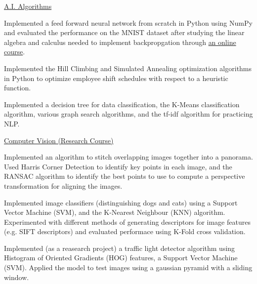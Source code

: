 
\begin{cventries}
  \cventry
    {} %
    {\href{https://github.com/dangbert/AI}{A.I. Algorithms}} %
    {} %
    {} %
    {
      \begin{cvitems} %
      \item {Implemented a feed forward neural network from scratch in Python using NumPy and evaluated the performance on the MNIST dataset after studying the linear algebra and calculus needed to implement backpropgation through \href{http://neuralnetworksanddeeplearning.com/}{an online course}.}
      \item {Implemented the Hill Climbing and Simulated Annealing optimization algorithms in Python 
to optimize employee shift schedules with respect to a heuristic function.}
      \item {Implemented a decision tree for data classification, the K-Means classification algorithm, various graph search algorithms, and the tf-idf algorithm for practicing NLP.}
      \end{cvitems}
    }

  \cventry
    {} %
    {\href{https://github.com/dangbert/college/tree/master/cmsc491-vision}{Computer Vision (Research Course)}} %
    {} %
    {} %
    {
      \begin{cvitems} %
        \item {Implemented an algorithm to stitch overlapping images together into a panorama.  Used Harris Corner Detection to identify key points in each image, and the RANSAC algorithm to identify the best points to use to compute a perspective transformation for aligning the images.}
        \item {Implemented image classifiers (distinguishing dogs and cats) using a Support Vector Machine (SVM), and the K-Nearest Neighbour (KNN) algorithm.  Experimented with different methods of generating descriptors for image features (e.g. SIFT descriptors) and evaluated performace using K-Fold cross validation.}
        \item {Implemented (as a reasearch project) a traffic light detector algorithm using Histogram of Oriented Gradients (HOG) features, a Support Vector Machine (SVM).  Applied the model to test images using a gaussian pyramid with a sliding window.}
      \end{cvitems}
    }


\end{cventries}
